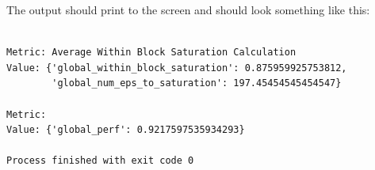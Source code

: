 The output should print to the screen and should look something like this:\\[0.2in]

\begin{verbatim}

Metric: Average Within Block Saturation Calculation
Value: {'global_within_block_saturation': 0.875959925753812, 
        'global_num_eps_to_saturation': 197.45454545454547}

Metric: 
Value: {'global_perf': 0.9217597535934293}

Process finished with exit code 0

\end{verbatim}
